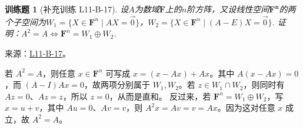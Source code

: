 \documentclass[UTF8,12pt,a4paper,fontset=fandol]{ctexart}
\newtheorem{exercise}{训练题}[section]
\begin{document}
\begin{exercise}[补充训练 L11-B-17]\label{prob:L11-B-17}
设$A$为数域$\mathbf{F}$上的$n$阶方阵，又设线性空间$\mathbf{F^n}$的两个子空间为$W_1=\{X\in\mathbf{F}^n \mid AX=\vec{0}\}$，$W_2=\{X\in\mathbf{F}^n \mid (A-E)X=\vec{0}\}$. 证明：$A^2=A \iff \mathbf{F}^n=W_1\oplus W_2$.
\end{exercise}
\noindent 来源：\href{https://github.com/yhwu-is/Linear-Algebra-Left-Undone/blob/new/%E8%AE%B2%E4%B9%89/%E4%B8%93%E9%A2%98/11%20%E6%9C%9D%E8%8A%B1%E5%A4%95%E6%8B%BE.tex}{L11-B-17}。
\begin{solve}
若 $A^2=A$，则任意 $x\in\mathbf F^n$ 可写成 $x=(x-Ax)+Ax$。其中 $A(x-Ax)=0$，而 $(A-I)Ax=0$，故两项分别属于 $W_1,W_2$。若 $z\in W_1\cap W_2$，则同时有 $Az=0$、$Az=z$，所以 $z=0$，从而是直和。
反过来，若 $\mathbf F^n=W_1\oplus W_2$，写 $x=u+v$，其中 $Au=0$、$Av=v$，则 $A^2x=Av=v=Ax$。因为这对任意 $x$ 成立，故 $A^2=A$。
\end{solve}
\end{document}
